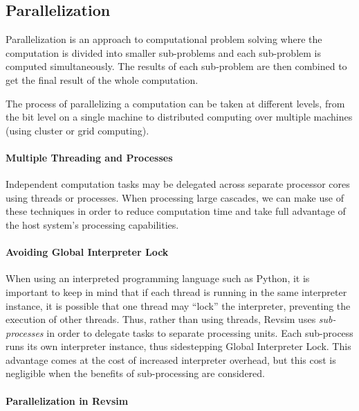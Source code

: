 \subsection{Parallelization}
Parallelization is an approach to computational problem solving where the computation is divided into smaller sub-problems and each sub-problem is computed simultaneously. The results of each sub-problem are then combined to get the final result of the whole computation.

The process of parallelizing a computation can be taken at different levels, from the bit level on a single machine to distributed computing over multiple machines (using cluster or grid computing).

\paragraph{Multiple Threading and Processes} Independent computation tasks may be delegated across separate processor cores using threads or processes. When processing large cascades, we can make use of these techniques in order to reduce computation time and take full advantage of the host system's processing capabilities.

\paragraph{Avoiding Global Interpreter Lock} When using an interpreted programming language such as Python, it is important to keep in mind that if each thread is running in the same interpreter instance, it is possible that one thread may ``lock'' the interpreter, preventing the execution of other threads. Thus, rather than using threads, Revsim uses \emph{sub-processes} in order to delegate tasks to separate processing units. Each sub-process runs its own interpreter instance, thus sidestepping Global Interpreter Lock. This advantage comes at the cost of increased interpreter overhead, but this cost is negligible when the benefits of sub-processing are considered. 

\paragraph{Parallelization in Revsim} 

